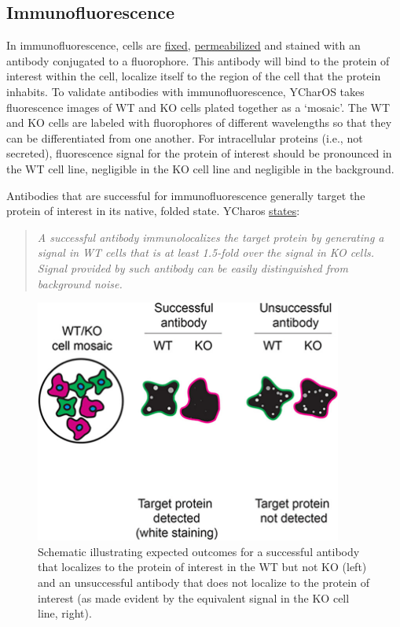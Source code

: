 \documentclass[letterpaper, 12pt]{article}
\begin{document}
\pagebreak

\subsection*{Immunofluorescence}

In immunofluorescence, cells are \href{https://en.wikipedia.org/wiki/Fixation_(histology)}{fixed}, \href{https://doi.org/10.1007/978-1-59745-324-0_9}{permeabilized} and stained with an antibody conjugated to a fluorophore. This antibody will bind to the protein of interest within the cell, localize itself to the region of the cell that the protein inhabits. To validate antibodies with immunofluorescence, YCharOS takes fluorescence images of WT and KO cells plated together as a `mosaic'.  The WT and KO cells are labeled with fluorophores of different wavelengths so that they can be differentiated from one another. For intracellular proteins (i.e., not secreted), fluorescence signal for the protein of interest should be pronounced in the WT cell line, negligible in the KO cell line and negligible in the background. 

Antibodies that are successful for immunofluorescence generally target the protein of interest in its native, folded state. YCharos \href{https://f1000research.com/gateways/ycharos/faqs}{states}:

\begin{quote}
    \textit{A successful antibody immunolocalizes the target protein by generating a signal in WT cells that is at least 1.5-fold over the signal in KO cells. Signal provided by such antibody can be easily distinguished from background noise.}
\end{quote}

\begin{figure}[h!tbp]
    \centering
    \includegraphics[width=0.9\textwidth]{img/antibody_val/ycharos_if.jpg}
    \caption*{Schematic illustrating expected outcomes for a successful antibody that localizes to the protein of interest in the WT but not KO (left) and an unsuccessful antibody that does not localize to the protein of interest (as made evident by the equivalent signal in the KO cell line, right).}
\end{figure}
\end{document}
